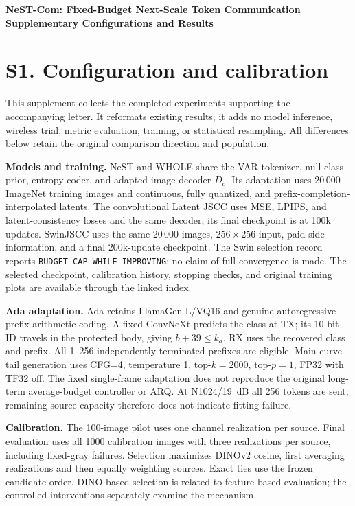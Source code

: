 \documentclass[11pt,letterpaper]{article}
\newcommand{\Dc}{D_c}
\begin{document}
\begin{center}\Large\bfseries NeST-Com: Fixed-Budget Next-Scale Token Communication\\[4pt]\large Supplementary Configurations and Results\end{center}
\section*{S1. Configuration and calibration}
This supplement collects the completed experiments supporting the accompanying letter. It reformats existing results; it adds no model inference, wireless trial, metric evaluation, training, or statistical resampling. All differences below retain the original comparison direction and population.

\textbf{Models and training.} NeST and WHOLE share the VAR tokenizer, null-class prior, entropy coder, and adapted image decoder $\Dc$. Its adaptation uses 20\,000 ImageNet training images and continuous, fully quantized, and prefix-completion-interpolated latents. The convolutional Latent JSCC uses MSE, LPIPS, and latent-consistency losses and the same decoder; its final checkpoint is at 100k updates. SwinJSCC uses the same 20\,000 images, $256\times256$ input, paid side information, and a final 200k-update checkpoint. The Swin selection record reports \texttt{BUDGET\_CAP\_WHILE\_IMPROVING}; no claim of full convergence is made. The selected checkpoint, calibration history, stopping checks, and original training plots are available through the linked index.

\textbf{Ada adaptation.} Ada retains LlamaGen-L/VQ16 and genuine autoregressive prefix arithmetic coding. A fixed ConvNeXt predicts the class at TX; its 10-bit ID travels in the protected body, giving $b+39\leq k_a$. RX uses the recovered class and prefix. All 1--256 independently terminated prefixes are eligible. Main-curve tail generation uses CFG=4, temperature 1, top-$k=2000$, top-$p=1$, FP32 with TF32 off. The fixed single-frame adaptation does not reproduce the original long-term average-budget controller or ARQ. At N1024/19~dB all 256 tokens are sent; remaining source capacity therefore does not indicate fitting failure.

\textbf{Calibration.} The 100-image pilot uses one channel realization per source. Final evaluation uses all 1000 calibration images with three realizations per source, including fixed-gray failures. Selection maximizes DINOv2 cosine, first averaging realizations and then equally weighting sources. Exact ties use the frozen candidate order. DINO-based selection is related to feature-based evaluation; the controlled interventions separately examine the mechanism.
\end{document}
